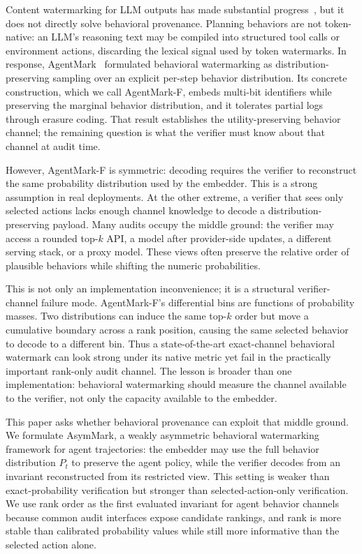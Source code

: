 \documentclass[conference,compsoc]{IEEEtran}
\newcommand{\framework}{AsymMark}
\newcommand{\agentmark}{AgentMark-F}
\begin{document}
Content watermarking for LLM outputs has made substantial progress~\cite{kirchenbauer2023watermark,dathathri2024synthid}, but it does not directly solve behavioral provenance. Planning behaviors are not token-native: an LLM's reasoning text may be compiled into structured tool calls or environment actions, discarding the lexical signal used by token watermarks. In response, AgentMark~\cite{agentmark2026} formulated behavioral watermarking as distribution-preserving sampling over an explicit per-step behavior distribution. Its concrete construction, which we call \agentmark{}, embeds multi-bit identifiers while preserving the marginal behavior distribution, and it tolerates partial logs through erasure coding. That result establishes the utility-preserving behavior channel; the remaining question is what the verifier must know about that channel at audit time.

However, \agentmark{} is symmetric: decoding requires the verifier to reconstruct the same probability distribution used by the embedder. This is a strong assumption in real deployments. At the other extreme, a verifier that sees only selected actions lacks enough channel knowledge to decode a distribution-preserving payload. Many audits occupy the middle ground: the verifier may access a rounded top-$k$ API, a model after provider-side updates, a different serving stack, or a proxy model. These views often preserve the relative order of plausible behaviors while shifting the numeric probabilities.

This is not only an implementation inconvenience; it is a structural verifier-channel failure mode. \agentmark{}'s differential bins are functions of probability masses. Two distributions can induce the same top-$k$ order but move a cumulative boundary across a rank position, causing the same selected behavior to decode to a different bin. Thus a state-of-the-art exact-channel behavioral watermark can look strong under its native metric yet fail in the practically important rank-only audit channel. The lesson is broader than one implementation: behavioral watermarking should measure the channel available to the verifier, not only the capacity available to the embedder.

This paper asks whether behavioral provenance can exploit that middle ground. We formulate \framework{}, a weakly asymmetric behavioral watermarking framework for agent trajectories: the embedder may use the full behavior distribution $P_t$ to preserve the agent policy, while the verifier decodes from an invariant reconstructed from its restricted view. This setting is weaker than exact-probability verification but stronger than selected-action-only verification. We use rank order as the first evaluated invariant for agent behavior channels because common audit interfaces expose candidate rankings, and rank is more stable than calibrated probability values while still more informative than the selected action alone.
\end{document}
